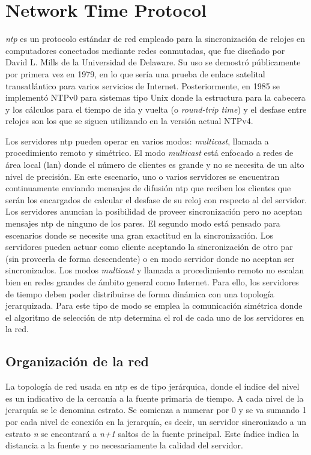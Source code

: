 \section{Network Time Protocol}

\textit{\acrlong{ntp}} \cite{Mills1991} es un protocolo estándar de red 
empleado para la sincronización de relojes en computadores conectados mediante 
redes conmutadas, que fue diseñado por David L. Mills de la Universidad de 
Delaware. Su uso se demostró públicamente por primera vez en 1979, en lo que 
sería una prueba de enlace satelital transatlántico para varios servicios de 
Internet. Posteriormente, en 1985 se implementó NTPv0 para sistemas tipo Unix 
donde la estructura para la cabecera y los cálculos para el tiempo de ida y 
vuelta (o \textit{round-trip time}) y el desfase entre relojes son los que se 
siguen utilizando en la versión actual NTPv4.

Los servidores \gls{ntp} pueden operar en varios modos: \textit{multicast}, 
llamada a procedimiento remoto y simétrico. El modo \textit{multicast} está 
enfocado a redes de área local (\gls{lan}) donde el número de clientes es 
grande y no se necesita de un alto nivel de precisión. En este escenario, uno o 
varios servidores se encuentran continuamente enviando mensajes de difusión 
\gls{ntp} que reciben los clientes que serán los encargados de calcular el 
desfase de su reloj con respecto al del servidor. Los servidores anuncian la 
posibilidad de proveer sincronización pero no aceptan mensajes \gls{ntp} de 
ninguno de los pares.
El segundo modo está pensado para escenarios donde se necesite una gran 
exactitud en la sincronización. Los servidores pueden actuar como cliente 
aceptando la sincronización de otro par (sin proveerla de forma descendente) o 
en modo servidor donde no aceptan ser sincronizados.
Los modos \textit{multicast} y llamada a procedimiento remoto no escalan bien 
en redes grandes de ámbito general como Internet. Para ello, los servidores de 
tiempo deben poder distribuirse de forma dinámica con una topología 
jerarquizada. Para este tipo de modo se emplea la comunicación simétrica donde 
el algoritmo de selección de \gls{ntp} determina el rol de cada uno de los 
servidores en la red.

\subsection{Organización de la red}

La topología de red usada en \gls{ntp} es de tipo jerárquica, donde el índice 
del nivel es un indicativo de la cercanía a la fuente primaria de tiempo. A 
cada nivel de la jerarquía se le denomina estrato. Se comienza a numerar por 0 
y se va sumando 1 por cada nivel de conexión en la jerarquía, es decir, un 
servidor sincronizado a un estrato \textit{n} se encontrará a \textit{n+1} 
saltos de la fuente principal. Este índice indica la distancia a la fuente y no 
necesariamente la calidad del servidor.

